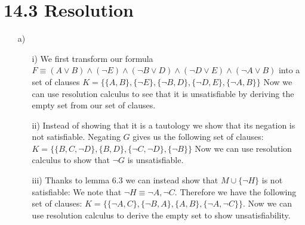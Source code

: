 \documentclass[12pt]{article}
\begin{document}
\section*{14.3 Resolution}
\begin{itemize}
    \item[a)]
        \begin{enumerate}
            \item[i)]We first transform our formula $F \equiv (A\lor B) \land (\neg E) \land (\neg B  \lor D) \land (\neg D \lor E) \land (\neg A \lor B)$ into a set of clauses $K = \{\{A, B\},\{\neg E\},\{\neg B, D\},\{\neg D,E\},\{\neg A , B\}\}$ Now we can use resolution calculus to see that it is unsatisfiable by deriving the empty set from our set of clauses. \par

            \item[ii)] Instead of showing that it is a tautology we show that its negation is not satisfiable. Negating $G$ gives us the following set of clauses: \\
            $K = \{ \{B,C,\neg D\}, \{B,D\},\{\neg C,\neg D\}, \{\neg B\} \}$ Now we can use resolution calculus to show that $\neg G$ is unsatisfiable.
            \par
            \item[iii)] Thanks to lemma 6.3 we can instead show that $M \cup \{\neg H\}$ is not satisfiable: We note that $\neg H \equiv \neg A, \neg C$. Therefore we have the following set of clauses: $K = \{\{\neg A , C\}, \{\neg B, A\},\{A,B\},\{\neg A,\neg C\}\}$. Now we can use resolution calculus to derive the empty set to show unsatisfiability.
            \par
            

\end{enumerate}
\end{itemize}
\end{document}
